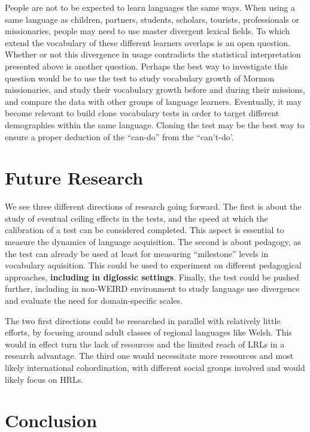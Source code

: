 People are not to be expected to learn languages the same ways. When using a same language as children, partners, students, scholars, tourists, professionals or missionaries, people may need to use master divergent lexical fields. To which extend the vocabulary of these different learners overlaps is an open question. Whether or not this divergence in usage contradicts the statistical interpretation presented above is another question. Perhaps the best way to investigate this question would be to use the test to study vocabulary growth of Mormon missionaries, and study their vocabulary growth before and during their missions, and compare the data with other groups of language learners. Eventually, it may become relevant to build clone vocabulary tests in order to target different demographies within the same language. Cloning the test may be the best way to ensure a proper deduction of the ``can-do'' from the ``can't-do'.

\section{Future Research}
We see three different directions of research going forward. The first is about the study of eventual ceiling effects in the tests, and the speed at which the calibration of a test can be considered completed. This aspect is essential to measure the dynamics of language acquisition. The second is about pedagogy, as the test can already be used at least for measuring ``milestone'' levels in vocabulary aquisition. This could be used to experiment on different pedagogical approaches, \textbf{including in diglossic settings}. Finally, the test could be pushed further, including in non-WEIRD environment to study language use divergence and evaluate the need for domain-specific scales.

The two first directions could be researched in parallel with relatively little efforts, by focusing around adult classes of regional languages like Welsh. This would in effect turn the lack of resources and the limited reach of LRLs in a research advantage. The third one would necessitate more ressources and most likely international cohordination, with different social groups involved and would likely focus on HRLs.

\section{Conclusion}



